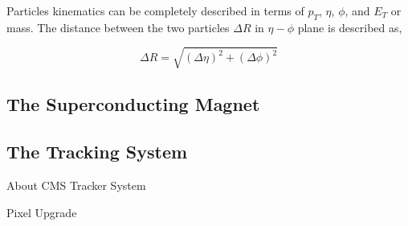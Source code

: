Particles kinematics can be completely described in terms of
\( p_{T} \), \( \eta \), \( \phi \), and \( E_{T} \) or mass.
The distance between the two particles \( \Delta R \) in \( \eta - \phi \) plane
is described as,

\begin{equation}
  \Delta R = \sqrt{ {(\Delta \eta)}^{2} + {(\Delta \phi)}^{2} }
\end{equation}



\subsection{
  The Superconducting Magnet
}

\subsection{
  The Tracking System
}

About \gls{CMS} Tracker System

Pixel Upgrade

